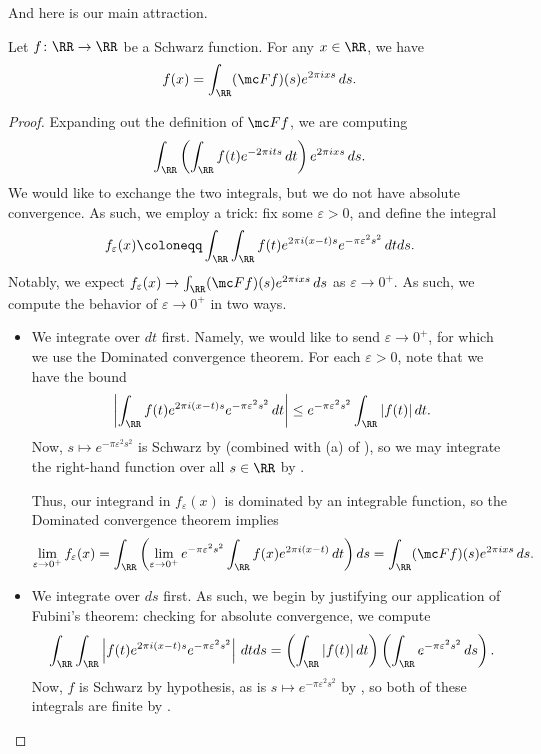 \documentclass[notes.tex]{subfiles}
\begin{document}
And here is our main attraction.
\begin{theorem} \label{thm:fourier-inversion}
	Let $f\colon\RR\to\RR$ be a Schwarz function. For any $x\in\RR$, we have
	\[f(x)=\int_\RR(\mc Ff)(s)e^{2\pi ixs}\,ds.\]
\end{theorem}
\begin{proof}
	Expanding out the definition of $\mc Ff$, we are computing
	\[\int_\RR\left(\int_\RR f(t)e^{-2\pi its}\,dt\right)e^{2\pi ixs}\,ds.\]
	We would like to exchange the two integrals, but we do not have absolute convergence. As such, we employ a trick: fix some $\varepsilon>0$, and define the integral
	\[f_\varepsilon(x)\coloneqq\int_\RR\int_\RR f(t)e^{2\pi i(x-t)s}e^{-\pi\varepsilon^2s^2}\,dtds.\]
	Notably, we expect $f_\varepsilon(x)\to\int_\RR(\mc Ff)(s)e^{2\pi ixs}\,ds$ as $\varepsilon\to0^+$. As such, we compute the behavior of $\varepsilon\to0^+$ in two ways.
	\begin{itemize}
		\item We integrate over $dt$ first. Namely, we would like to send $\varepsilon\to0^+$, for which we use the Dominated convergence theorem. For each $\varepsilon>0$, note that we have the bound
		\[\left|\int_\RR f(t)e^{2\pi i(x-t)s}e^{-\pi\varepsilon^2s^2}\,dt\right|\le e^{-\pi\varepsilon^2s^2}\int_\RR|f(t)|\,dt.\]
		Now, $s\mapsto e^{-\pi\varepsilon^2s^2}$ is Schwarz by  (combined with (a) of ), so we may integrate the right-hand function over all $s\in\RR$ by .

		Thus, our integrand in $f_\varepsilon(x)$ is dominated by an integrable function, so the Dominated convergence theorem implies
		\[\lim_{\varepsilon\to0^+}f_\varepsilon(x)=\int_\RR\left(\lim_{\varepsilon\to0^+}e^{-\pi\varepsilon^2s^2}\int_\RR f(x)e^{2\pi i(x-t)}\,dt\right)ds=\int_\RR(\mc Ff)(s)e^{2\pi ixs}\,ds.\]
		\item We integrate over $ds$ first. As such, we begin by justifying our application of Fubini's theorem: checking for absolute convergence, we compute
		\[\int_\RR\int_\RR\left|f(t)e^{2\pi i(x-t)s}e^{-\pi\varepsilon^2s^2}\right|\,dtds=\left(\int_\RR|f(t)|\,dt\right)\left(\int_\RR e^{-\pi\varepsilon^2s^2}\,ds\right).\]
		Now, $f$ is Schwarz by hypothesis, as is $s\mapsto e^{-\pi\varepsilon^2s^2}$ by , so both of these integrals are finite by .


\end{itemize}
\end{proof}
\end{document}
